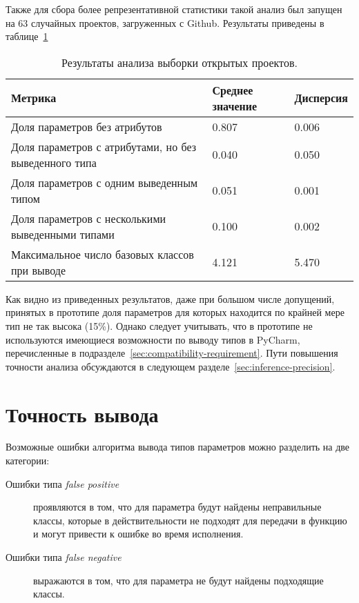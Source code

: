 Также для сбора более репрезентативной статистики такой анализ был запущен на 63
случайных проектов, загруженных с Github. Результаты приведены в
таблице~\ref{tab:statistics-results-2}

\begin{table}[H]
  \scriptsize
  \caption{Результаты анализа выборки открытых проектов.}
  \label{tab:statistics-results-2}
  \begin{tabularx}{\textwidth}{ |X|X|X| }
    \hline
    Метрика & Среднее значение & Дисперсия \\ \hline
    Доля параметров без атрибутов & 0.807 & 0.006 \\ \hline
    Доля параметров с атрибутами, но без выведенного типа & 0.040 & 0.050 \\ \hline
    Доля параметров с одним выведенным типом & 0.051 & 0.001 \\ \hline
    Доля параметров с несколькими выведенными типами & 0.100 & 0.002 \\ \hline
    Максимальное число базовых классов при выводе & 4.121 & 5.470 \\ \hline
  \end{tabularx}
\end{table}

Как видно из приведенных результатов, даже при большом числе допущений,
принятых в прототипе доля параметров для которых находится по крайней мере тип
не так высока (15\%).  Однако следует учитывать, что в прототипе не используются
имеющиеся возможности по выводу типов в PyCharm, перечисленные в
подразделе~\ref{sec:compatibility-requirement}.  Пути повышения точности анализа
обсуждаются в следующем разделе~\ref{sec:inference-precision}.

\section{Точность вывода}
\label{sec:inference-precision-analysis}

Возможные ошибки алгоритма вывода типов параметров можно разделить на две категории:
\begin{description}
    \item[Ошибки типа \emph{false positive}] проявляются в том, что для параметра
      будут найдены неправильные классы, которые в
      действительности не подходят для передачи в функцию и могут привести к
      ошибке во время исполнения.

    \item[Ошибки типа \emph{false negative}] выражаются в том, что для параметра
      не будут найдены подходящие классы.

\end{description}

